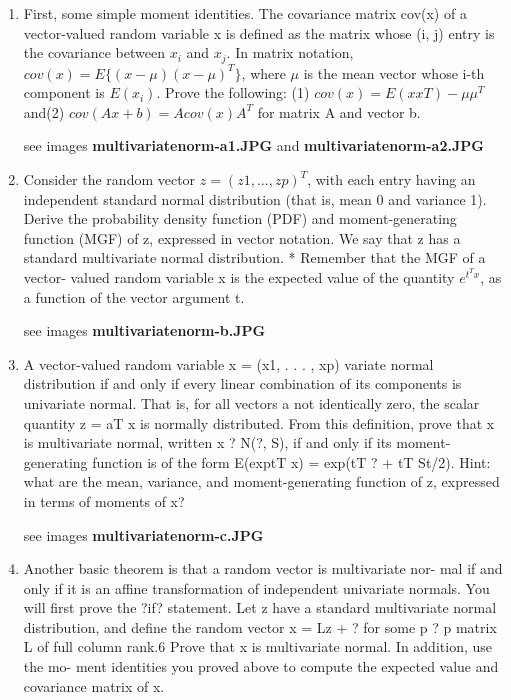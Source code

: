 \documentclass{homework}
\begin{document}
\begin{enumerate}[label=(\Alph*)]
\item First, some simple moment identities. The covariance matrix cov(x) of a vector-valued random variable x is defined as the matrix whose (i, j) entry is the covariance between $x_i$ and $x_j$. In matrix notation, $cov(x) = E\{(x - \mu)(x - \mu)^T\}$, where $\mu$ is the mean vector whose i-th component is $E(x_i)$. Prove the following: (1) $cov(x) = E(xxT) - \mu\mu^T$ and(2) $cov(Ax + b) = Acov(x)A^T$ for matrix A and vector b.

\par * see images \textbf{multivariatenorm-a1.JPG} and \textbf{multivariatenorm-a2.JPG}

\item Consider the random vector $z = (z1, . . . , zp)^T$, with each entry having an independent standard normal distribution (that is, mean 0 and variance 1). Derive the probability density function (PDF) and moment-generating function (MGF) of z, expressed in vector notation.  We say that z has a standard multivariate normal distribution. * Remember that the MGF of a vector- valued random variable x is the expected value of the quantity $e^{t^T x}$, as a function of the vector argument t.

\par * see images \textbf{multivariatenorm-b.JPG}

\item A vector-valued random variable x = (x1, . . . , xp)
variate normal distribution if and only if every linear combination of its components is univariate normal. That is, for all vectors a not identically zero, the scalar quantity z = aT x is normally distributed. From this definition, prove that x is multivariate normal, written
x ? N(?, S), if and only if its moment-generating function is of the form E(exp{tT x}) = exp(tT ? + tT St/2). Hint: what are the mean, variance, and moment-generating function of z, expressed in terms of moments of x?

\par * see images \textbf{multivariatenorm-c.JPG}

\item Another basic theorem is that a random vector is multivariate nor- mal if and only if it is an affine transformation of independent univariate normals. You will first prove the ?if? statement. Let z have a standard multivariate normal distribution, and define the random vector x = Lz + ? for some p ? p matrix L of full column rank.6 Prove that x is multivariate normal. In addition, use the mo- ment identities you proved above to compute the expected value and covariance matrix of x.


\end{enumerate}
\end{document}
